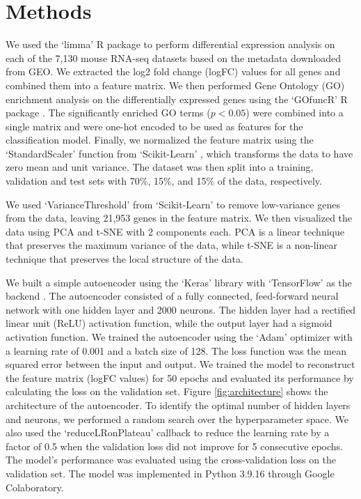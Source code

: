 
\section{Methods}

We used the `limma' R package \cite{limma} to perform differential expression analysis
on each of the 7,130 mouse RNA-seq datasets based on the metadata downloaded from GEO.
We extracted the log2 fold change (logFC) values for all genes and combined them into a
feature matrix. We then performed Gene Ontology (GO) enrichment analysis on the
differentially expressed genes using the `GOfuncR' R package \cite{GOfuncR}. The
significantly enriched GO terms ($p < 0.05$) were combined into a single matrix and were
one-hot encoded to be used as features for the classification model. Finally, we
normalized the feature matrix using the `StandardScaler' function from `Scikit-Learn'
\cite{sklearn}, which transforms the data to have zero mean and unit variance. The
dataset was then split into a training, validation and test sets with 70\%, 15\%, and
15\% of the data, respectively.

\vspace{0.2cm}

We used `VarianceThreshold' from `Scikit-Learn' \cite{sklearn} to remove low-variance
genes from the data, leaving 21,953 genes in the feature matrix. We then visualized the
data using PCA and t-SNE with 2 components each. PCA is a linear technique that preserves
the maximum variance of the data, while t-SNE is a non-linear technique that preserves
the local structure of the data.

\vspace{0.2cm}

We built a simple autoencoder using the `Keras' library with `TensorFlow' as the backend
\cite{tensorflow}. The autoencoder consisted of a fully connected, feed-forward neural
network with one hidden layer and 2000 neurons. The hidden layer had a rectified linear
unit (ReLU) activation function, while the output layer had a sigmoid activation function.
We trained the autoencoder using the `Adam' optimizer with a learning rate of 0.001 and a
batch size of 128. The loss function was the mean squared error between the input and
output. We trained the model to reconstruct the feature matrix (logFC values) for 50
epochs and evaluated its performance by calculating the loss on the validation set.
Figure \ref{fig:architecture} shows the architecture of the autoencoder. To identify the
optimal number of hidden layers and neurons, we performed a random search over the
hyperparameter space. We also used the `reduceLRonPlateau' callback to reduce the
learning rate by a factor of 0.5 when the validation loss did not improve for 5
consecutive epochs. The model's performance was evaluated using the cross-validation
loss on the validation set. The model was implemented in Python 3.9.16 through Google
Colaboratory.

